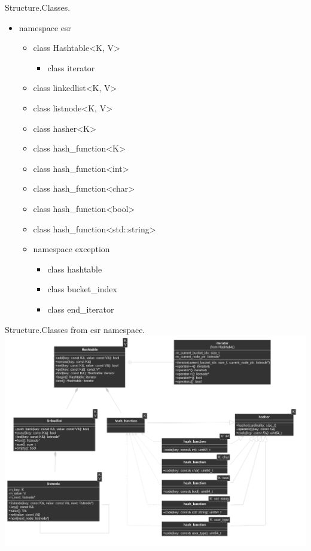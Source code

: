 \documentclass{beamer}
\begin{document}
\begin{frame}{Structure.}{Classes.}
  \begin{itemize}
  \item namespace esr
    \begin{itemize}
      \item class Hashtable<K, V>
        \begin{itemize}
          \item class iterator
        \end{itemize}
      \item class linkedlist<K, V>
      \item class listnode<K, V>
      \item class hasher<K>
      \item class hash\_function<K>
      \item class hash\_function<int>
      \item class hash\_function<char>
      \item class hash\_function<bool>
      \item class hash\_function<std::string>
      \item namespace exception
        \begin{itemize}
          \item class hashtable
          \item class bucket\_index 
          \item class end\_iterator
        \end{itemize}
    \end{itemize}
  \end{itemize}
\end{frame}


\begin{frame}{Structure.}{Classes from esr namespace.}
    \includegraphics[scale=0.3]{pictures/structure_classes}
\end{frame}
\end{document}
